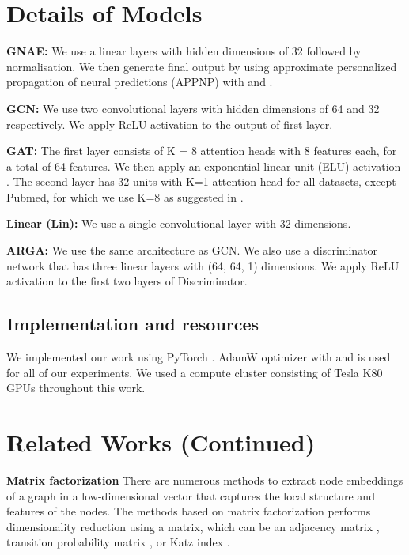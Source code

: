 \documentclass{article}
\begin{document}
\section{Details of Models}\label{details_of_models}

\textbf{GNAE:} We use a linear layers with hidden dimensions of 32 followed by  normalisation. We then generate final output by using approximate personalized propagation of neural predictions (APPNP) \citep{gasteiger2018predict} with  and .


\textbf{GCN:} We use two convolutional layers with hidden dimensions of 64 and 32 respectively. We apply ReLU activation \citep{nair2010rectified} to the output of first layer.

\textbf{GAT:} The first layer consists of K = 8 attention heads with 8 features each, for a total of 64 features. We then apply an exponential linear unit (ELU) activation \citep{clevert2015fast}. The second layer has 32 units with K=1 attention head for all datasets, except Pubmed, for which we use K=8 as suggested in \citep{velivckovic2017graph}.

\textbf{Linear (Lin):} We use a single convolutional layer with 32 dimensions.

\textbf{ARGA:} We use the same architecture as GCN. We also use a discriminator network that has three linear layers with (64, 64, 1) dimensions. We apply ReLU activation to the first two layers of Discriminator.


\subsection{Implementation and resources}\label{implementation_resources}
We implemented our work using PyTorch \citep{NEURIPS2019_9015}. AdamW optimizer \citep{loshchilov2017decoupled} with  and  is used for all of our experiments. We used a compute cluster consisting of Tesla K80 GPUs throughout this work. 


\section{Related Works (Continued)}

\textbf{Matrix factorization} There are numerous methods to extract node embeddings of a graph in a low-dimensional vector that captures the local structure and features of the nodes. The methods based on matrix factorization performs dimensionality reduction using a matrix, which can be an adjacency matrix \citep{ahmed2013distributed}, transition probability matrix \citep{cao2015grarep}, or Katz index \citep{katz1953new}. 
\end{document}
